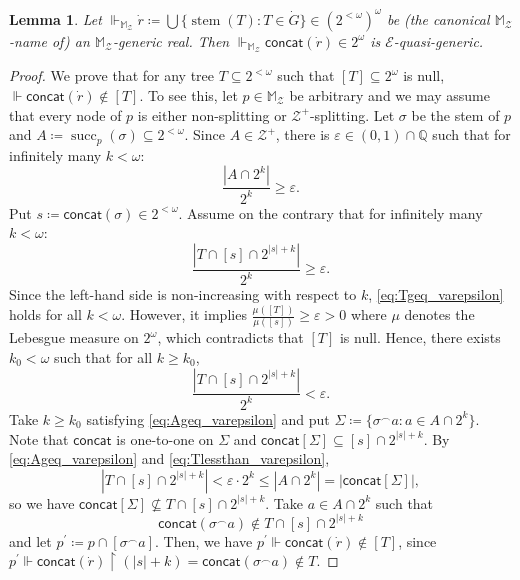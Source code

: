 \documentclass[a4paper,12pt]{amsart}
\newtheorem{lem}[thm]{Lemma}
\theoremstyle{definition}
\numberwithin{thm}{section}
\numberwithin{equation}{section}
\newcommand{\sq}{2^{<\omega}}
\newcommand{\on}{\mathpunct{\upharpoonright}}
\newcommand{\forces}{\Vdash}
\newcommand{\Z}{\mathcal{Z}}
\DeclareMathOperator{\stem}{stem}
\DeclareMathOperator{\suc}{succ}
\newcommand{\cantortree}{2^{<\omega}}
\newcommand{\cano}{(\cantortree)^\omega}
\newcommand{\bbmz}{\mathbb{M}_{\Z}}
\begin{document}
    \begin{lem}
    \label{lem:bbmz_adds_PEg}
        Let $\forces_{\bbmz}\dot{r}\coloneqq\bigcup\{\stem(T):T\in\dot{G}\}\in\cano$ be (the canonical $\bbmz$-name of) an $\bbmz$-generic real. Then $\forces_{\bbmz} \mathsf{concat}(\dot{r})\in 2^{\omega}$ is $\mathcal{E}$-quasi-generic.
    \end{lem}
    \begin{proof}
        We prove that for any tree $T\subseteq\sq$ such that $[T]\subseteq2^\omega$ is null, $\forces \mathsf{concat}(\dot{r})\notin[T]$. To see this, let $p\in\bbmz$ be arbitrary and we may assume that every node of $p$ is either non-splitting or $\Z^+$-splitting. Let $\sigma$ be the stem of $p$ and $A\coloneqq\suc_p(\sigma)\subseteq\sq$. Since $A\in\Z^+$, there is $\varepsilon\in(0,1)\cap\mathbb{Q}$ such that for infinitely many $k<\omega$: 
        \begin{equation}\label{eq:Ageq_varepsilon}
            \frac{|A\cap 2^k|}{2^k}\geq\varepsilon.
        \end{equation}
        Put $s\coloneqq \mathsf{concat}(\sigma)\in\sq$. Assume on the contrary that for infinitely many $k<\omega$:
        \begin{equation}\label{eq:Tgeq_varepsilon}
            \frac{|T\cap[s]\cap2^{|s|+k}|}{2^k}\geq\varepsilon.
        \end{equation}
        Since the left-hand side is non-increasing with respect to $k$, \eqref{eq:Tgeq_varepsilon} holds for all $k<\omega$. However, it implies $\frac{\mu([T])}{\mu([s])}\geq\varepsilon>0$ where $\mu$ denotes the Lebesgue measure on $2^\omega$, which contradicts that $[T]$ is null. Hence, there exists $k_0<\omega$ such that for all $k\geq k_0$, 
        \begin{equation}\label{eq:Tlessthan_varepsilon}
            \frac{|T\cap[s]\cap2^{|s|+k}|}{2^k}<\varepsilon.
        \end{equation}
        Take $k\geq k_0$ satisfying \eqref{eq:Ageq_varepsilon} and put $\Sigma\coloneqq\{\sigma^\frown a:a\in A\cap 2^k\}$. Note that $\mathsf{concat}$ is one-to-one on $\Sigma$ and $\mathsf{concat}[\Sigma]\subseteq [s]\cap 2^{|s|+k}$. By \eqref{eq:Ageq_varepsilon} and \eqref{eq:Tlessthan_varepsilon},
        \begin{equation*}
            |T\cap[s]\cap 2^{|s|+k}|<\varepsilon\cdot2^k\leq|A\cap 2^k|=|\mathsf{concat}[\Sigma]|,
        \end{equation*}
        so we have $\mathsf{concat}[\Sigma]\nsubseteq T\cap[s]\cap 2^{|s|+k}$.
        Take $a\in A\cap 2^k$ such that
        \[
        \mathsf{concat}(\sigma^\frown a)\notin T\cap[s]\cap 2^{|s|+k}
        \]
        and let $p^\prime\coloneqq p\cap[\sigma^\frown a]$. Then, we have $p^\prime\forces \mathsf{concat}(\dot{r})\notin [T]$, since $p^\prime\forces \mathsf{concat}(\dot{r})\on(|s|+k)=\mathsf{concat}(\sigma^\frown a)\notin T$.
    \end{proof}
    
\end{document}
